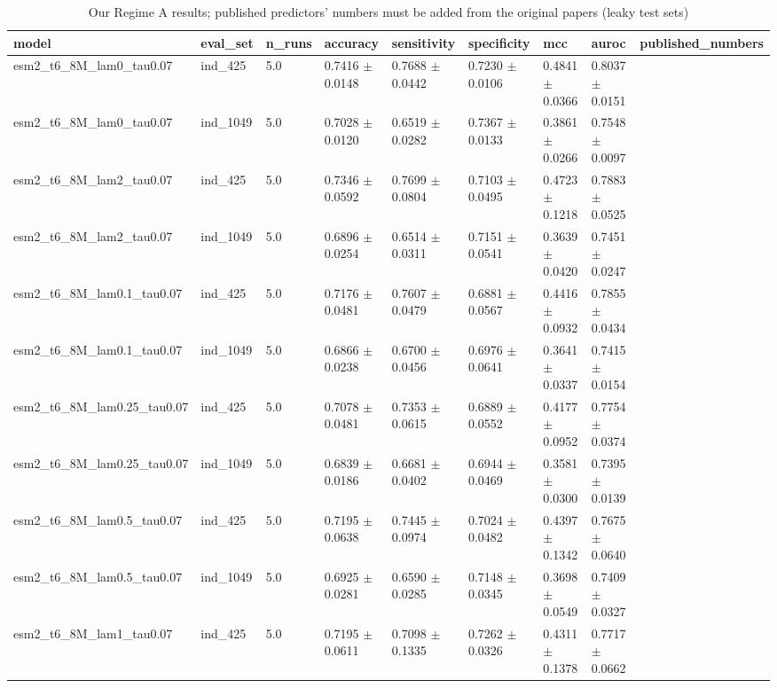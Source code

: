 \begin{table}[ht]
\centering\small
\caption{Our Regime A results; published predictors' numbers must be added from the original papers (leaky test sets)}
\label{tab:T5_7_comparison_published}
\begin{tabular}{lllllllll}
\hline
model & eval\_set & n\_runs & accuracy & sensitivity & specificity & mcc & auroc & published\_numbers \\
\hline
esm2\_t6\_8M\_lam0\_tau0.07 & ind\_425 & 5.0 & 0.7416 $\pm$ 0.0148 & 0.7688 $\pm$ 0.0442 & 0.7230 $\pm$ 0.0106 & 0.4841 $\pm$ 0.0366 & 0.8037 $\pm$ 0.0151 &  \\
esm2\_t6\_8M\_lam0\_tau0.07 & ind\_1049 & 5.0 & 0.7028 $\pm$ 0.0120 & 0.6519 $\pm$ 0.0282 & 0.7367 $\pm$ 0.0133 & 0.3861 $\pm$ 0.0266 & 0.7548 $\pm$ 0.0097 &  \\
esm2\_t6\_8M\_lam2\_tau0.07 & ind\_425 & 5.0 & 0.7346 $\pm$ 0.0592 & 0.7699 $\pm$ 0.0804 & 0.7103 $\pm$ 0.0495 & 0.4723 $\pm$ 0.1218 & 0.7883 $\pm$ 0.0525 &  \\
esm2\_t6\_8M\_lam2\_tau0.07 & ind\_1049 & 5.0 & 0.6896 $\pm$ 0.0254 & 0.6514 $\pm$ 0.0311 & 0.7151 $\pm$ 0.0541 & 0.3639 $\pm$ 0.0420 & 0.7451 $\pm$ 0.0247 &  \\
esm2\_t6\_8M\_lam0.1\_tau0.07 & ind\_425 & 5.0 & 0.7176 $\pm$ 0.0481 & 0.7607 $\pm$ 0.0479 & 0.6881 $\pm$ 0.0567 & 0.4416 $\pm$ 0.0932 & 0.7855 $\pm$ 0.0434 &  \\
esm2\_t6\_8M\_lam0.1\_tau0.07 & ind\_1049 & 5.0 & 0.6866 $\pm$ 0.0238 & 0.6700 $\pm$ 0.0456 & 0.6976 $\pm$ 0.0641 & 0.3641 $\pm$ 0.0337 & 0.7415 $\pm$ 0.0154 &  \\
esm2\_t6\_8M\_lam0.25\_tau0.07 & ind\_425 & 5.0 & 0.7078 $\pm$ 0.0481 & 0.7353 $\pm$ 0.0615 & 0.6889 $\pm$ 0.0552 & 0.4177 $\pm$ 0.0952 & 0.7754 $\pm$ 0.0374 &  \\
esm2\_t6\_8M\_lam0.25\_tau0.07 & ind\_1049 & 5.0 & 0.6839 $\pm$ 0.0186 & 0.6681 $\pm$ 0.0402 & 0.6944 $\pm$ 0.0469 & 0.3581 $\pm$ 0.0300 & 0.7395 $\pm$ 0.0139 &  \\
esm2\_t6\_8M\_lam0.5\_tau0.07 & ind\_425 & 5.0 & 0.7195 $\pm$ 0.0638 & 0.7445 $\pm$ 0.0974 & 0.7024 $\pm$ 0.0482 & 0.4397 $\pm$ 0.1342 & 0.7675 $\pm$ 0.0640 &  \\
esm2\_t6\_8M\_lam0.5\_tau0.07 & ind\_1049 & 5.0 & 0.6925 $\pm$ 0.0281 & 0.6590 $\pm$ 0.0285 & 0.7148 $\pm$ 0.0345 & 0.3698 $\pm$ 0.0549 & 0.7409 $\pm$ 0.0327 &  \\
esm2\_t6\_8M\_lam1\_tau0.07 & ind\_425 & 5.0 & 0.7195 $\pm$ 0.0611 & 0.7098 $\pm$ 0.1335 & 0.7262 $\pm$ 0.0326 & 0.4311 $\pm$ 0.1378 & 0.7717 $\pm$ 0.0662 &  \\

\end{tabular}
\end{table}
